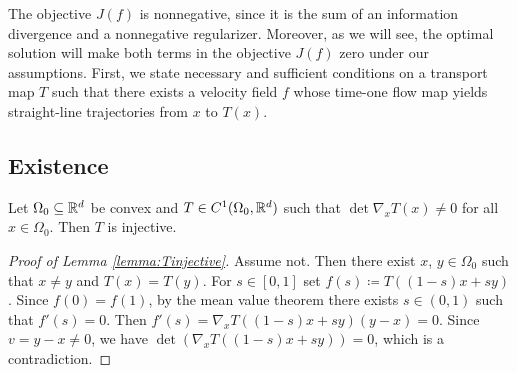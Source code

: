 The objective $J(f)$ is nonnegative, since it is the sum of an information divergence and a nonnegative regularizer.  Moreover, as we will see, the optimal solution will make both terms in the objective $J(f)$ zero under our assumptions. 
%
First, we state necessary and sufficient conditions on a transport map $T$ such that there exists a velocity field $f$ whose time-one flow map yields straight-line trajectories from $x$ to $T(x)$.


\subsection{Existence}\label{subsec:existence}
\begin{lemma}\label{lemma:Tinjective}
  Let $\Omega_0\subseteq\mathbb{R}^d$ be convex and
    $T\in C^1(\Omega_0,\mathbb{R}^d)$ such that $\det \nabla_x T(x)\neq 0$ for
    all $x\in\Omega_0$.  Then $T$ is injective.  
\end{lemma}
\begin{proof}[Proof of Lemma \ref{lemma:Tinjective}]
  Assume not. Then there exist $x$, $y\in\Omega_0$ such that
    $x \neq y$ and $T(x) = T(y)$. For $s\in [0,1]$ set
    $f(s)  \coloneqq  T((1-s)x + sy)$. Since $f(0) = f(1)$, by the mean
    value theorem there exists $s\in (0,1)$ such that
  $f'(s) = 0$. Then $f'(s) = \nabla_x T((1-s)x + sy)(y-x) =
  0$. Since $v = y-x \neq 0$, we have
    $\det(\nabla_x T((1-s)x + sy))=0$, which is a contradiction.
\end{proof}	

